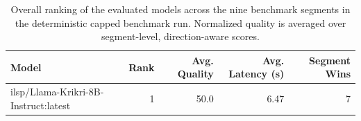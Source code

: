 \begin{table}[t]
\centering
\caption{Overall ranking of the evaluated models across the nine benchmark segments in the deterministic capped benchmark run. Normalized quality is averaged over segment-level, direction-aware scores.}
\label{tab:capped-overall-ranking}
\begin{tabular}{lrrrr}
\toprule
Model & Rank & Avg. Quality & Avg. Latency (s) & Segment Wins \\
\midrule
ilsp/Llama-Krikri-8B-Instruct:latest & 1 & 50.0 & 6.47 & 7 \\
\bottomrule
\end{tabular}
\end{table}

